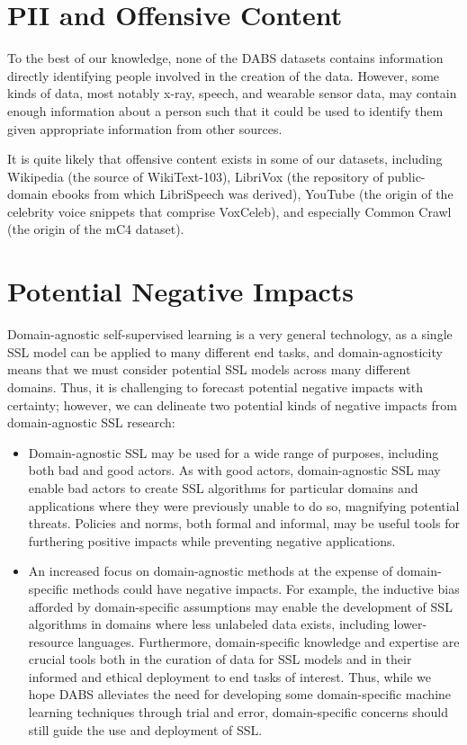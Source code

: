 \documentclass{article}
\begin{document}
\section{PII and Offensive Content}
\label{appendix:pii-offense}

To the best of our knowledge, none of the DABS datasets contains information directly identifying people involved in the creation of the data. However, some kinds of data, most notably  x-ray, speech, and wearable sensor data, may contain enough information about a person such that it could be used to identify them given appropriate information from other sources. 

It is quite likely that offensive content exists in some of our datasets, including Wikipedia (the source of WikiText-103), LibriVox (the repository of public-domain ebooks from which LibriSpeech was derived), YouTube (the origin of the celebrity voice snippets that comprise VoxCeleb), and especially Common Crawl (the origin of the mC4 dataset).


\section{Potential Negative Impacts}
\label{appendix:negative-impacts}

Domain-agnostic self-supervised learning is a very general technology, as a single SSL model can be applied to many different end tasks, and domain-agnosticity means that we must consider potential SSL models across many different domains. Thus, it is challenging to forecast potential negative impacts with certainty; however, we can delineate two potential kinds of negative impacts from domain-agnostic SSL research:
\begin{itemize}
    \item Domain-agnostic SSL may be used for a wide range of purposes, including both bad and good actors. As with good actors, domain-agnostic SSL may enable bad actors to create SSL algorithms for particular domains and applications where they were previously unable to do so, magnifying potential threats. Policies and norms, both formal and informal, may be useful tools for furthering positive impacts while preventing negative applications.
    \item An increased focus on domain-agnostic methods at the expense of domain-specific methods could have negative impacts. For example, the inductive bias afforded by domain-specific assumptions may enable the development of SSL algorithms in domains where less unlabeled data exists, including lower-resource languages. Furthermore, domain-specific knowledge and expertise are crucial tools both in the curation of data for SSL models and in their informed and ethical deployment to end tasks of interest. Thus, while we hope DABS alleviates the need for developing some domain-specific machine learning techniques through trial and error, domain-specific concerns should still guide the use and deployment of SSL.
\end{itemize}
\end{document}
